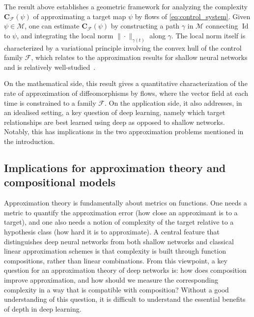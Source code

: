 \documentclass[12pt]{amsart}
\numberwithin{equation}{section}
\theoremstyle{remark}
\newcommand{\ql}[1]{\texttt{\color{cyan} QL: \footnotesize #1}}
\begin{document}

The result above establishes a geometric framework for analyzing the complexity $\mathbf C_{\mathcal F}(\psi)$ of approximating a target map $\psi$ by flows of \eqref{eq:control_system}. Given $\psi\in\mathcal M$, one can estimate $\mathbf C_{\mathcal F}(\psi)$ by constructing a path $\gamma$ in $\mathcal M$ connecting $\operatorname{Id}$ to $\psi$, and integrating the local norm $\|\cdot\|_{\gamma(t)}$ 
along $\gamma$. The local norm itself is characterized by a variational principle involving the convex hull of the control family $\mathcal F$, which relates to the approximation results for shallow neural networks and is relatively well-studied~\cite{barron2002universal, ma2022barron,siegel2020approximation,siegel2023characterization}.

On the mathematical side, this result gives a quantitative
characterization of the rate of approximation of diffeomorphisms by flows,
where the vector field at each time is constrained to a family $\mathcal F$.
On the application side, it also addresses, in an idealised setting,
a key question of deep learning, namely which target relationships are best
learned using deep as opposed to shallow networks. Notably, this has implications in the two approximation problems mentioned in the introduction.



\subsection{Implications for approximation theory and compositional models}
\label{subsec:approx-theory-interpretation}
Approximation theory is fundamentally about metrics on functions. One needs a metric to quantify the approximation error (how close an approximant is to a target), and one also needs a notion of complexity of the target relative to a hypothesis class (how hard it is to approximate). A central feature that distinguishes deep neural networks from both shallow networks and classical linear approximation schemes is that complexity is built through function compositions, rather than linear combinations. From this viewpoint, a key question for an approximation theory of deep networks is: how does composition improve approximation, and how should we measure the corresponding complexity in a way that is compatible with composition? Without a good understanding of this question, it is difficult to understand the essential benefits of depth in deep learning.
\end{document}
